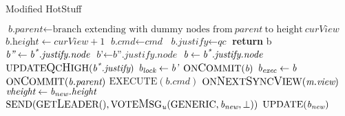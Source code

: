 \begin{algorithm}[h!]
	\caption{Modified HotStuff}\label{hotstuff}
	\begin{algorithmic}[1]
	\color{Magenta}
		\State $\textit{b.parent} \gets \text{branch extending with dummy nodes from}\ \textit{parent}\ \text{to height}\ \textit{curView}$
		\State $\textit{b.height} \gets \textit{curView} + 1$
		\State $\textit{b.cmd} \gets \textit{cmd}$
		\State $\textit{b.justify} \gets \textit{qc}$
		\State \textbf{return} b
	\EndFunction
	\color{black}
		\State $\textit{b''} \gets \textit{b\textsuperscript{*}.justify.node}$
		\State $\textit{b'} \gets \textit{b''.justify.node}$
		\State $\textit{b} \gets \textit{b\textsuperscript{*}.justify.node}$
		\State $\text{UPDATE{\large Q}C{\large H}IGH}(\textit{b\textsuperscript{*}.justify})$
			\State $\textit{b\textsubscript{lock}} \gets \textit{b'}$
		\EndIf
			\State $\text{ON{\large C}OMMIT}(\textit{b})$
			\State $\textit{b\textsubscript{exec}} \gets \textit{b}$
		\EndIf
	\EndProcedure
			\State $\text{ON{\large C}OMMIT}(\textit{b.parent})$
			\State $\text{EXECUTE}(\textit{b.cmd})$
		\EndIf
	\EndProcedure
		\color{Green}
				\State $\text{ON{\large N}EXT{\large S}YNC{\large V}IEW}(\textit{m.view})$
			\EndIf
				\color{black}
					\State $\textit{vheight} \gets \textit{b\textsubscript{new}.height}$
					\State $ \text{SEND}(\text{GET{\large L}EADER}(), \text{VOTE{\large M}SG}\textsubscript{\textit{u}}(\text{GENERIC}, \textit{b\textsubscript{new}}, \bot))$
				\EndIf
				\State $\text{UPDATE}(\textit{b\textsubscript{new}})$
				\color{Green}

\end{algorithmic}
\end{algorithm}
